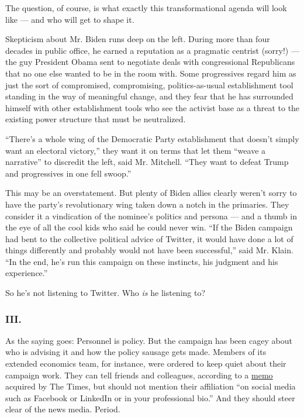 The question, of course, is what exactly this transformational agenda
will look like --- and who will get to shape it.

Skepticism about Mr. Biden runs deep on the left. During more than four
decades in public office, he earned a reputation as a pragmatic centrist
(sorry!) --- the guy President Obama sent to negotiate deals with
congressional Republicans that no one else wanted to be in the room
with. Some progressives regard him as just the sort of compromised,
compromising, politics-as-usual establishment tool standing in the way
of meaningful change, and they fear that he has surrounded himself with
other establishment tools who see the activist base as a threat to the
existing power structure that must be neutralized.

``There's a whole wing of the Democratic Party establishment that
doesn't simply want an electoral victory,'' they want it on terms that
let them ``weave a narrative'' to discredit the left, said Mr. Mitchell.
``They want to defeat Trump and progressives in one fell swoop.''

This may be an overstatement. But plenty of Biden allies clearly weren't
sorry to have the party's revolutionary wing taken down a notch in the
primaries. They consider it a vindication of the nominee's politics and
persona --- and a thumb in the eye of all the cool kids who said he
could never win. ``If the Biden campaign had bent to the collective
political advice of Twitter, it would have done a lot of things
differently and probably would not have been successful,'' said Mr.
Klain. ``In the end, he's run this campaign on these instincts, his
judgment and his experience.''

So he's not listening to Twitter. Who \emph{is} he listening to?

\hypertarget{iii}{%
\subsubsection{III.}\label{iii}}

As the saying goes: Personnel is policy. But the campaign has been cagey
about who is advising it and how the policy sausage gets made. Members
of its extended economics team, for instance, were ordered to keep quiet
about their campaign work. They can tell friends and colleagues,
according to a
\href{https://www.nytimes.com/2020/06/11/us/politics/joe-biden-campaign-economy.html}{memo}
acquired by The Times, but should not mention their affiliation ``on
social media such as Facebook or LinkedIn or in your professional bio.''
And they should steer clear of the news media. Period.

